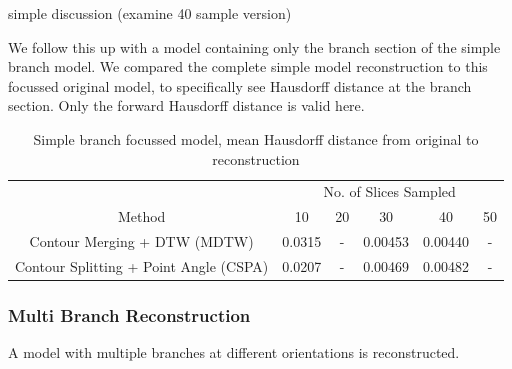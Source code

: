 \documentclass[11p, titlepage]{article}
\begin{document}
simple discussion (examine 40 sample version)

We follow this up with a model containing only the branch section of the simple branch model. We compared the complete simple model reconstruction to this focussed original model, to specifically see Hausdorff distance at the branch section. Only the forward Hausdorff distance is valid here.

\begin{table}[h]
\begin{tabular}{ | c | c | c | c | c | c | }
\hline
& \multicolumn{5}{c|}{No. of Slices Sampled} \\
\cline{2-6}
Method & 10 & 20 & 30 & 40 & 50 \\
\hline
Contour Merging + DTW (MDTW) & 0.0315 & - & 0.00453 & 0.00440 & - \\
Contour Splitting + Point Angle (CSPA) & 0.0207 & - & 0.00469 & 0.00482 & - \\
\hline
\end{tabular}
\caption{Simple branch focussed model, mean Hausdorff distance from original to reconstruction}
\label{table:simple_branch_focussed_forward}
\end{table}

\subsubsection{Multi Branch Reconstruction}

A model with multiple branches at different orientations is reconstructed.
\end{document}

